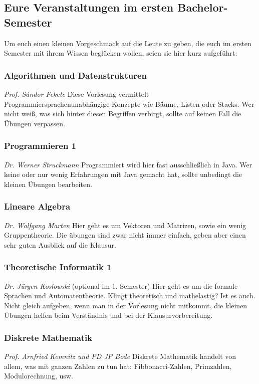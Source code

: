 \begin{multicols}{2}
\subsection{Eure Veranstaltungen im ersten Bachelor-Semester}
	Um euch einen kleinen Vorgeschmack auf die Leute zu geben, die euch im ersten Semester mit ihrem Wissen beglücken wollen, seien sie hier kurz aufgeführt:

\subsubsection{Algorithmen und Datenstrukturen}
	\textit{Prof. S\'andor Fekete}
	Diese Vorlesung vermittelt Programmiersprachenunabhängige Konzepte wie Bäume, Listen oder Stacks. Wer nicht weiß, was sich hinter diesen Begriffen verbirgt, sollte auf keinen Fall die Übungen verpassen.

\subsubsection{Programmieren 1}
	\textit{Dr. Werner Struckmann}
	Programmiert wird hier fast ausschließlich in Java. Wer keine oder nur wenig Erfahrungen mit Java gemacht hat, sollte unbedingt die kleinen Übungen bearbeiten.

\subsubsection{Lineare Algebra}
	\textit{Dr. Wolfgang Marten}
	Hier geht es um Vektoren und Matrizen, sowie ein wenig Gruppentheorie. Die übungen sind zwar nicht immer einfach, geben aber einen sehr guten Ausblick auf die Klausur.

\subsubsection{Theoretische Informatik 1}
	\textit{Dr. Jürgen Koslowski}
	(optional im 1. Semester) Hier geht es um die formale Sprachen und Automatentheorie. Klingt theoretisch und mathelastig? Ist es auch. Nicht gleich aufgeben, wenn man in der Vorlesung nicht mitkommt, die kleinen Übungen helfen beim Verständnis und bei der Klausurvorbereitung.

\subsubsection{Diskrete Mathematik}
	\textit{Prof. Arnfried Kemnitz und PD JP Bode}
	Diskrete Mathematik handelt von allem, was mit ganzen Zahlen zu tun hat: Fibbonacci-Zahlen, Primzahlen, Modulorechnung, usw. 
\end{multicols}

